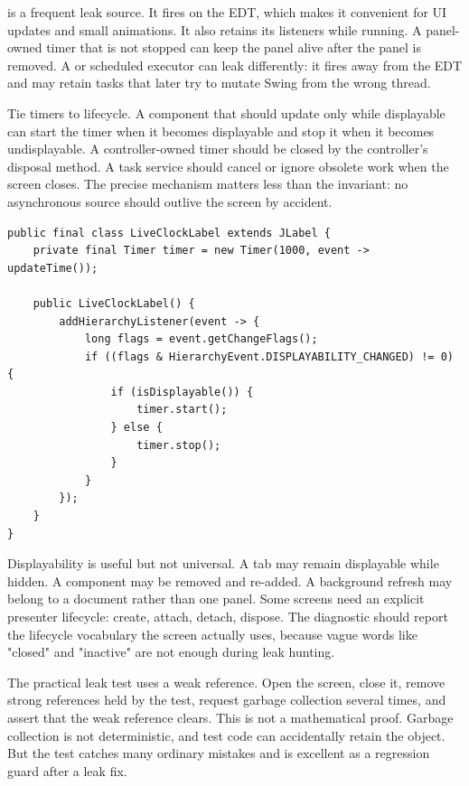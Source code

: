  is a frequent leak source. It fires on the EDT, which makes it convenient for UI updates and small animations. It also retains its listeners while running. A panel-owned timer that is not stopped can keep the panel alive after the panel is removed. A  or scheduled executor can leak differently: it fires away from the EDT and may retain tasks that later try to mutate Swing from the wrong thread.

Tie timers to lifecycle. A component that should update only while displayable can start the timer when it becomes displayable and stop it when it becomes undisplayable. A controller-owned timer should be closed by the controller's disposal method. A task service should cancel or ignore obsolete work when the screen closes. The precise mechanism matters less than the invariant: no asynchronous source should outlive the screen by accident.

\begin{lstlisting}[caption={Starting and stopping a Swing timer with displayability.}]
public final class LiveClockLabel extends JLabel {
    private final Timer timer = new Timer(1000, event -> updateTime());

    public LiveClockLabel() {
        addHierarchyListener(event -> {
            long flags = event.getChangeFlags();
            if ((flags & HierarchyEvent.DISPLAYABILITY_CHANGED) != 0) {
                if (isDisplayable()) {
                    timer.start();
                } else {
                    timer.stop();
                }
            }
        });
    }
}
\end{lstlisting}

Displayability is useful but not universal. A tab may remain displayable while hidden. A component may be removed and re-added. A background refresh may belong to a document rather than one panel. Some screens need an explicit presenter lifecycle: create, attach, detach, dispose. The diagnostic should report the lifecycle vocabulary the screen actually uses, because vague words like "closed" and "inactive" are not enough during leak hunting.

The practical leak test uses a weak reference. Open the screen, close it, remove strong references held by the test, request garbage collection several times, and assert that the weak reference clears. This is not a mathematical proof. Garbage collection is not deterministic, and test code can accidentally retain the object. But the test catches many ordinary mistakes and is excellent as a regression guard after a leak fix.

